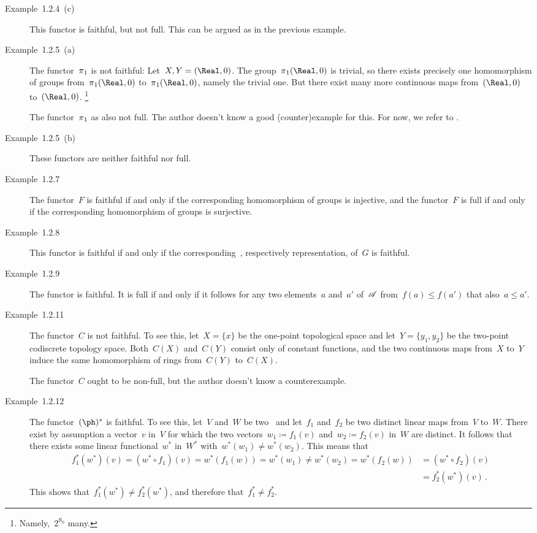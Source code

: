 \begin{description}
	\item[Example~1.2.4~(c)]
		This functor is faithful, but not full.
		This can be argued as in the previous example.

	\item[Example~1.2.5~(a)]
		The functor~$\operatorname{\pi}_1$ is not faithful:
		Let~$X, Y = (\Real, 0)$.
		The group~$\fgroup_1(\Real, 0)$ is trivial, so there exists precisely one homomorphism of groups from~$\fgroup_1(\Real, 0)$ to~$\fgroup_1(\Real, 0)$, namely the trivial one.
		But there exist many more continuous maps from~$(\Real, 0)$ to~$(\Real, 0)$.%
		\footnote{
			Namely,~$2^{\aleph_0}$ many.
		}
		
		The functor~$\operatorname{\pi}_1$ as also not full.
		The author doesn’t know a good (counter)example for this.
		For now, we refer to \cite{stackexchange_pi_1_not_full}.

	\item[Example~1.2.5~(b)]
		These functors are neither faithful nor full.

	\item[Example~1.2.7]
		The functor~$F$ is faithful if and only if the corresponding homomorphism of groups is injective, and the functor~$F$ is full if and only if the corresponding homomorphism of groups is surjective.

	\item[Example~1.2.8]
		This functor is faithful if and only if the corresponding~, respectively representation, of~$G$ is faithful.

	\item[Example~1.2.9]
		The functor is faithful.
		It is full if and only if it follows for any two elements~$a$ and~$a'$ of~$\mathscr{A}$ from~$f(a) ≤ f(a')$ that also~$a ≤ a'$.

	\item[Example~1.2.11]
		The functor~$C$ is not faithful.
		To see this, let~$X = \{ x \}$ be the one-point topological space and let~$Y= \{ y_1, y_2 \}$ be the two-point codiscrete topology space.
		Both~$C(X)$ and~$C(Y)$ consist only of constant functions, and the two continuous maps from~$X$ to~$Y$ induce the same homomorphism of rings from~$C(Y)$ to~$C(X)$.
		
		The functor~$C$ ought to be non-full, but the author doesn’t know a counterexample.

	\item[Example~1.2.12]

		The functor~$(\ph)^*$ is faithful.
		To see this, let~$V$ and~$W$ be two~\vectorspaces{$\kf$} and let~$f_1$ and~$f_2$ be two distinct linear maps from~$V$ to~$W$.
		There exist by assumption a vector~$v$ in~$V$ for which the two vectors~$w_1 ≔ f_1(v)$ and~$w_2 ≔ f_2(v)$ in~$W$ are distinct.
		It follows that there exists some linear functional~$w^*$ in~$W^*$ with~$w^*(w_1) ≠ w^*(w_2)$.
		This means that
		\begin{align*}
			f_1^*(w^*)(v)
			=
			(w^* ∘ f_1)(v)
			=
			w^*( f_1(w) )
			=
			w^*(w_1)
			≠
			w^*(w_2)
			=
			w^*( f_2(w) )
			&=
			(w^* ∘ f_2)(v)
			\\
			&=
			f_2^*(w^*)(v) \,.
		\end{align*}
		This shows that~$f_1^*(w^*) ≠ f_2^*(w^*)$, and therefore that~$f_1^* ≠ f_2^*$.
		

\end{description}
